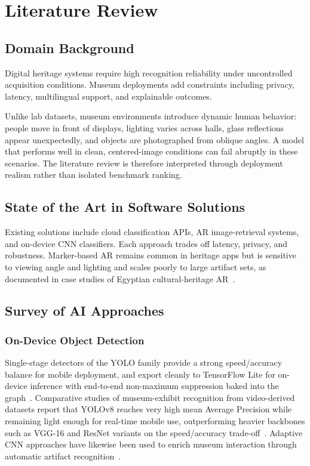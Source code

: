\chapter{Literature Review}

\section{Domain Background}

Digital heritage systems require high recognition reliability under uncontrolled
acquisition conditions. Museum deployments add constraints including privacy,
latency, multilingual support, and explainable outcomes.

Unlike lab datasets, museum environments introduce dynamic human behavior: people
move in front of displays, lighting varies across halls, glass reflections appear
unexpectedly, and objects are photographed from oblique angles. A model that performs
well in clean, centered-image conditions can fail abruptly in these scenarios. The
literature review is therefore interpreted through deployment realism rather than
isolated benchmark ranking.

\section{State of the Art in Software Solutions}

Existing solutions include cloud classification APIs, AR image-retrieval systems, and
on-device CNN classifiers. Each approach trades off latency, privacy, and robustness.
Marker-based AR remains common in heritage apps but is sensitive to viewing angle and
lighting and scales poorly to large artifact sets, as documented in case studies of
Egyptian cultural-heritage AR~\citep{abdelhady2025enhancing}.

\section{Survey of AI Approaches}

\subsection{On-Device Object Detection}
Single-stage detectors of the YOLO family provide a strong speed/accuracy balance for
mobile deployment, and export cleanly to TensorFlow Lite for on-device inference with
end-to-end non-maximum suppression baked into the graph~\citep{yolov8}. Comparative
studies of museum-exhibit recognition from video-derived datasets report that YOLOv8
reaches very high mean Average Precision while remaining light enough for real-time
mobile use, outperforming heavier backbones such as VGG-16 and ResNet variants on the
speed/accuracy trade-off~\citep{ipalakova2025comparative}. Adaptive CNN approaches
have likewise been used to enrich museum interaction through automatic artifact
recognition~\citep{wen2024enhancing}.

